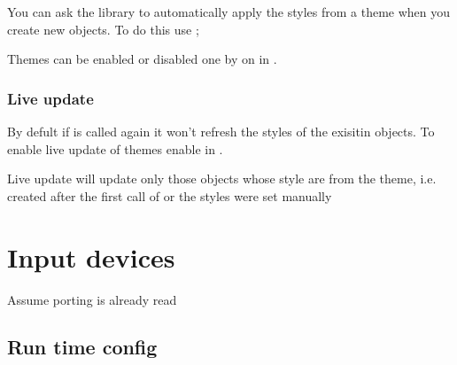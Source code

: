 \documentclass[letterpaper,10pt,english]{sphinxmanual}
\begin{document}
You can ask the library to automatically apply the styles from a theme when you create new objects. To do this use ;

\begin{sphinxVerbatim}[commandchars=\\\{\}]
    

   
\end{sphinxVerbatim}

Themes can be enabled or disabled one by on in .


\subsubsection{Live update}
\label{\detokenize{overview/styles:live-update}}
By defult if  is called again it won’t refresh the styles of the exisitin objects. To enable live update of themes enable  in .

Live update will update only those objects whose style are from the theme, i.e. created after the first call of  or the styles were set manually


\section{Input devices}
\label{\detokenize{overview/indev:input-devices}}\label{\detokenize{overview/indev::doc}}
Assume porting is already read


\subsection{Run time config}
\label{\detokenize{overview/indev:run-time-config}}
\end{document}
